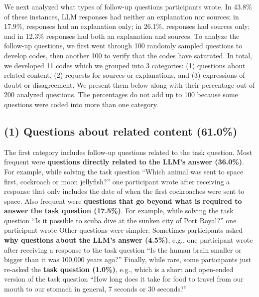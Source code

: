 We next analyzed what types of follow-up questions participants wrote.
In 43.8\% of these instances, LLM responses had neither an explanation nor sources; in 17.9\%, responses had an explanation only; in 26.1\%, responses had sources only; and in 12.3\% responses had both an explanation and sources.
To analyze the follow-up questions, we first went through 100 randomly sampled questions to develop codes, then another 100 to verify that the codes have saturated.
In total, we developed 11 codes which we grouped into 3 categories: (1) questions about related content, (2) requests for sources or explanations, and (3) expressions of doubt or disagreement.
We present them below along with their percentage out of 200 analyzed questions.
The percentages do not add up to 100 because some questions were coded into more than one category. 


\subsection*{(1) Questions about related content (61.0\%)}

The first category includes follow-up questions related to the task question.
Most frequent were \textbf{questions directly related to the LLM's answer (36.0\%)}. 
For example, while solving the task question ``Which animal was sent to space first, cockroach or moon jellyfish?'' one participant wrote  after receiving a response that only includes the date of when the first cockroaches were sent to space.
Also frequent were \textbf{questions that go beyond what is required to answer the task question (17.5\%)}. For example, while solving the task question ``Is it possible to scuba dive at the sunken city of Port Royal?'' one participant wrote 
Other questions were simpler.
Sometimes participants asked \textbf{why questions about the LLM's answer (4.5\%)}, e.g., one participant wrote after receiving a response to the task question ``Is the human brain smaller or bigger than it was 100,000 years ago?''
Finally, while rare, some participants just re-asked the \textbf{task question (1.0\%)}, e.g.,  which is a short and open-ended version of the task question ``How long does it take for food to travel from our mouth to our stomach in general, 7 seconds or 30 seconds?''


